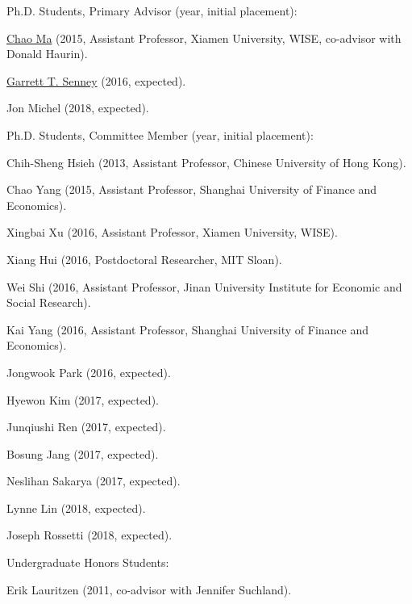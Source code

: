 \documentclass[10pt,letterpaper]{article}
\renewenvironment{itemize}{
  \begin{list}{}{
    \setlength{\leftmargin}{1.5em}
    \setlength{\itemsep}{0.25em}
    \setlength{\parskip}{0pt}
    \setlength{\parsep}{0.25em}
  }
}{
  \end{list}
}
\begin{document}
\begin{itemize}
\item Ph.D. Students, Primary Advisor (year, initial placement):
  \begin{itemize}
  \item \href{http://chaoma2014.weebly.com}{Chao Ma} (2015, Assistant Professor, Xiamen University, WISE, co-advisor with Donald Haurin).
  \item \href{http://garrettsenney.weebly.com}{Garrett T. Senney} (2016, expected).
  \item Jon Michel (2018, expected).
  \end{itemize}
\item Ph.D. Students, Committee Member (year, initial placement):
  \begin{itemize}
  \item Chih-Sheng Hsieh (2013, Assistant Professor, Chinese University of Hong Kong).
  \item Chao Yang (2015, Assistant Professor, Shanghai University of Finance and Economics).
  \item Xingbai Xu (2016, Assistant Professor, Xiamen University, WISE).
  \item Xiang Hui (2016, Postdoctoral Researcher, MIT Sloan).
  \item Wei Shi (2016, Assistant Professor, Jinan University Institute for Economic and Social Research).
  \item Kai Yang (2016, Assistant Professor, Shanghai University of Finance and Economics).
  \item Jongwook Park (2016, expected).
  \item Hyewon Kim (2017, expected).
  \item Junqiushi Ren (2017, expected).
  \item Bosung Jang (2017, expected).
  \item Neslihan Sakarya (2017, expected).
  \item Lynne Lin (2018, expected).
  \item Joseph Rossetti (2018, expected).
  \end{itemize}
\item Undergraduate Honors Students:
  \begin{itemize}
  \item Erik Lauritzen (2011, co-advisor with Jennifer Suchland).
  \end{itemize}
\end{itemize}
\end{document}
